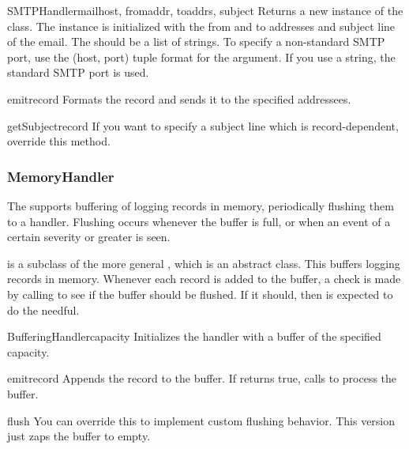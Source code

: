 \begin{classdesc}{SMTPHandler}{mailhost, fromaddr, toaddrs, subject}
Returns a new instance of the  class. The
instance is initialized with the from and to addresses and subject
line of the email. The  should be a list of strings. To specify a
non-standard SMTP port, use the (host, port) tuple format for the
 argument. If you use a string, the standard SMTP port
is used.
\end{classdesc}

\begin{methoddesc}{emit}{record}
Formats the record and sends it to the specified addressees.
\end{methoddesc}

\begin{methoddesc}{getSubject}{record}
If you want to specify a subject line which is record-dependent,
override this method.
\end{methoddesc}

\subsubsection{MemoryHandler}

The  supports buffering of logging records in memory,
periodically flushing them to a  handler. Flushing occurs
whenever the buffer is full, or when an event of a certain severity or
greater is seen.

 is a subclass of the more general
, which is an abstract class. This buffers logging
records in memory. Whenever each record is added to the buffer, a
check is made by calling  to see if the buffer
should be flushed.  If it should, then  is expected to
do the needful.

\begin{classdesc}{BufferingHandler}{capacity}
Initializes the handler with a buffer of the specified capacity.
\end{classdesc}

\begin{methoddesc}{emit}{record}
Appends the record to the buffer. If  returns true,
calls  to process the buffer.
\end{methoddesc}

\begin{methoddesc}{flush}{}
You can override this to implement custom flushing behavior. This version
just zaps the buffer to empty.
\end{methoddesc}

